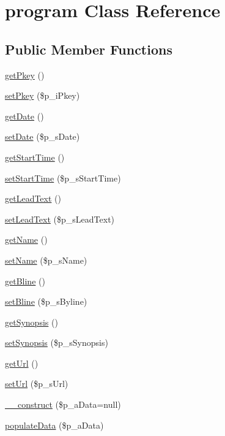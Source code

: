 \hypertarget{classprogram}{\section{program Class Reference}
\label{classprogram}
}
\subsection*{Public Member Functions}
\begin{DoxyCompactItemize}
\item 
\hyperlink{classprogram_ac3f9d3c54d6fc31cf4ba8ee432250666}{get\-Pkey} ()
\item 
\hyperlink{classprogram_a2ac6ba685cbdbeaf1463acd2dda00723}{set\-Pkey} (\$p\-\_\-i\-Pkey)
\item 
\hyperlink{classprogram_a24d89b0ad05ea2e33626b1fc8ed59bc3}{get\-Date} ()
\item 
\hyperlink{classprogram_a975325739702b848dbe479b271eba40c}{set\-Date} (\$p\-\_\-s\-Date)
\item 
\hyperlink{classprogram_a568a7fafd601b520ff8c4bd91c962e29}{get\-Start\-Time} ()
\item 
\hyperlink{classprogram_a463e88d39545b8f5f3d191ee27bc95e7}{set\-Start\-Time} (\$p\-\_\-s\-Start\-Time)
\item 
\hyperlink{classprogram_a81ae59ce90d8e38356b0cad6851874e8}{get\-Lead\-Text} ()
\item 
\hyperlink{classprogram_a745b080e2d6c57a525c27e03ee61d184}{set\-Lead\-Text} (\$p\-\_\-s\-Lead\-Text)
\item 
\hyperlink{classprogram_a3d0963e68bb313b163a73f2803c64600}{get\-Name} ()
\item 
\hyperlink{classprogram_ab2d173090c606a8d0fff92a527707565}{set\-Name} (\$p\-\_\-s\-Name)
\item 
\hyperlink{classprogram_a770c51195d42a0a4933dc178bd6e2647}{get\-Bline} ()
\item 
\hyperlink{classprogram_a1bdde3b3633236fe5c3155cb9acaaf0d}{set\-Bline} (\$p\-\_\-s\-Byline)
\item 
\hyperlink{classprogram_a689e3214627e1e86671c39f506bb5ff5}{get\-Synopsis} ()
\item 
\hyperlink{classprogram_a9ff116e3d48acc95e9e53637dff65c21}{set\-Synopsis} (\$p\-\_\-s\-Synopsis)
\item 
\hyperlink{classprogram_accd14bda49a1044b4d8dd93f020f11ee}{get\-Url} ()
\item 
\hyperlink{classprogram_aa9f609d71b5936f6b51a5de0a86f4bec}{set\-Url} (\$p\-\_\-s\-Url)
\item 
\hyperlink{classprogram_a7c869f75ec8886cf1ece704ff07bdb6f}{\-\_\-\-\_\-construct} (\$p\-\_\-a\-Data=null)
\item 
\hyperlink{classprogram_a9c4738291eb554f8c6fbdaf85706bb47}{populate\-Data} (\$p\-\_\-a\-Data)
\end{DoxyCompactItemize}


